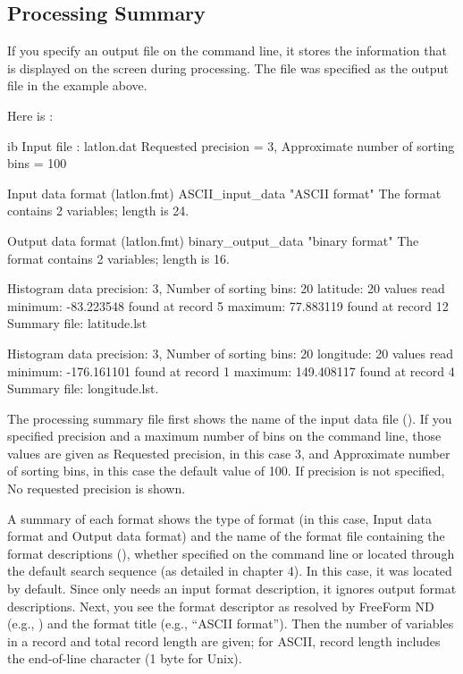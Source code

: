 \subsection{Processing Summary}

If you specify an output file on the command line, it stores the
information that is displayed on the screen during processing. The
file  was specified as the output file in the example
above.

Here is :

\begin{vcode}{ib}
Input file : latlon.dat
Requested precision = 3, Approximate number of sorting bins = 100

Input data format       (latlon.fmt)
ASCII_input_data       "ASCII format"
The format contains 2 variables; length is 24.

Output data format       (latlon.fmt)
binary_output_data       "binary format"
The format contains 2 variables; length is 16.

Histogram data precision: 3, Number of sorting bins: 20
latitude: 20 values read
minimum: -83.223548 found at record  5
maximum:  77.883119 found at record 12
Summary file: latitude.lst

Histogram data precision: 3, Number of sorting bins: 20
longitude: 20 values read
minimum: -176.161101 found at record 1
maximum:  149.408117 found at record 4
Summary file: longitude.lst. 
\end{vcode}

The processing summary file  first shows the name of
the input data file (). If you specified precision and
a maximum number of bins on the command line, those values are given
as Requested precision, in this case 3, and Approximate number of
sorting bins, in this case the default value of 100. If precision is
not specified, No requested precision is shown.

A summary of each format shows the type of format (in this case, Input
data format and Output data format) and the name of the format file
containing the format descriptions (), whether
specified on the command line or located through the default search
sequence (as detailed in chapter 4). In this case, it was located by
default. Since  only needs an input format description,
it ignores output format descriptions. Next, you see the format
descriptor as resolved by FreeForm ND (e.g., )
and the format title (e.g., ``ASCII format''). Then the number of
variables in a record and total record length are given; for ASCII,
record length includes the end-of-line character (1 byte for Unix).

